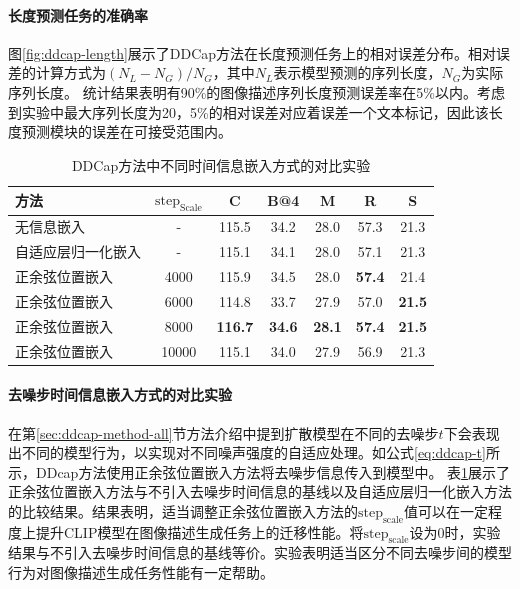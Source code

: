 \paragraph{长度预测任务的准确率} 图\ref{fig:ddcap-length}展示了DDCap方法在长度预测任务上的相对误差分布。相对误差的计算方式为$(N_{L}-N_{G})/N_{G}$，其中$N_{L}$表示模型预测的序列长度，$N_{G}$为实际序列长度。
统计结果表明有90\%的图像描述序列长度预测误差率在5\%以内。考虑到实验中最大序列长度为20，5\%的相对误差对应着误差一个文本标记，因此该长度预测模块的误差在可接受范围内。

\begin{table}
  \centering
  \caption{DDCap方法中不同时间信息嵌入方式的对比实验}
  \begin{tabular}{lcccccc}
    \toprule
    方法 & $\text{step}_{\text{Scale}}$ & C & B@4 & M & R & S\\
    \midrule
    无信息嵌入 & - & 115.5 & 34.2  & 28.0 & 57.3 & 21.3\\
    自适应层归一化嵌入 & - & 115.1  & 34.1 & 28.0 & 57.1 & 21.3\\
    正余弦位置嵌入 & 4000 & 115.9 & 34.5  & 28.0 & \textbf{57.4} & 21.4\\
    正余弦位置嵌入 & 6000 & 114.8  & 33.7  & 27.9 & 57.0 & \textbf{21.5}\\
   正余弦位置嵌入 & 8000 & \textbf{116.7}  & \textbf{34.6}  & \textbf{28.1} & \textbf{57.4} & \textbf{21.5}\\
   正余弦位置嵌入 & 10000 & 115.1  & 34.0  & 27.9 & 56.9 & 21.3\\
    \bottomrule
  \end{tabular}
  \label{tab:ddcap-adaptivet}
\end{table}

\paragraph{去噪步时间信息嵌入方式的对比实验} 
在第\ref{sec:ddcap-method-all}节方法介绍中提到扩散模型在不同的去噪步$t$下会表现出不同的模型行为，以实现对不同噪声强度的自适应处理。如公式\eqref{eq:ddcap-t}所示，DDcap方法使用正余弦位置嵌入方法将去噪步信息传入到模型中。
表\ref{tab:ddcap-adaptivet}展示了正余弦位置嵌入方法与不引入去噪步时间信息的基线以及自适应层归一化嵌入方法的比较结果。结果表明，适当调整正余弦位置嵌入方法的$\text{step}_{\text{scale}}$值可以在一定程度上提升CLIP模型在图像描述生成任务上的迁移性能。将$\text{step}_{\text{scale}}$设为0时，实验结果与不引入去噪步时间信息的基线等价。实验表明适当区分不同去噪步间的模型行为对图像描述生成任务性能有一定帮助。

